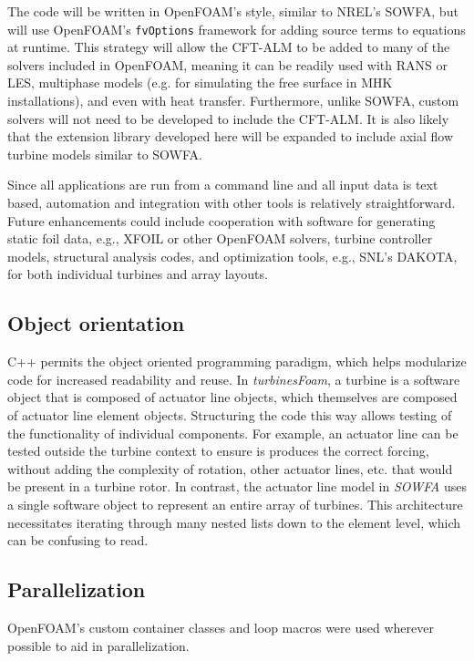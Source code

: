 The code will be written in OpenFOAM's style, similar to NREL's SOWFA, but will
use OpenFOAM's \texttt{fvOptions} framework for adding source terms to equations
at runtime. This strategy will allow the CFT-ALM to be added to many of the
solvers included in OpenFOAM, meaning it can be readily used with RANS or LES,
multiphase models (e.g. for simulating the free surface in MHK installations),
and even with heat transfer. Furthermore, unlike SOWFA, custom solvers will not
need to be developed to include the CFT-ALM. It is also likely that the
extension library developed here will be expanded to include axial flow turbine
models similar to SOWFA.

Since all applications are run from a command line and all input data is text
based, automation and integration with other tools is relatively
straightforward. Future enhancements could include cooperation with software for
generating static foil data, e.g., XFOIL or other OpenFOAM solvers, turbine
controller models, structural analysis codes, and optimization tools, e.g.,
SNL's DAKOTA, for both individual turbines and array layouts.


\subsection{Object orientation}

C++ permits the object oriented programming paradigm, which helps modularize
code for increased readability and reuse. In \textit{turbinesFoam}, a turbine is
a software object that is composed of actuator line objects, which themselves
are composed of actuator line element objects. Structuring the code this way
allows testing of the functionality of individual components. For example, an
actuator line can be tested outside the turbine context to ensure is produces
the correct forcing, without adding the complexity of rotation, other actuator
lines, etc. that would be present in a turbine rotor. In contrast, the actuator
line model in \textit{SOWFA} uses a single software object to represent an
entire array of turbines. This architecture necessitates iterating through many
nested lists down to the element level, which can be confusing to read.


\subsection{Parallelization}

OpenFOAM's custom container classes and loop macros were used wherever possible
to aid in parallelization.


